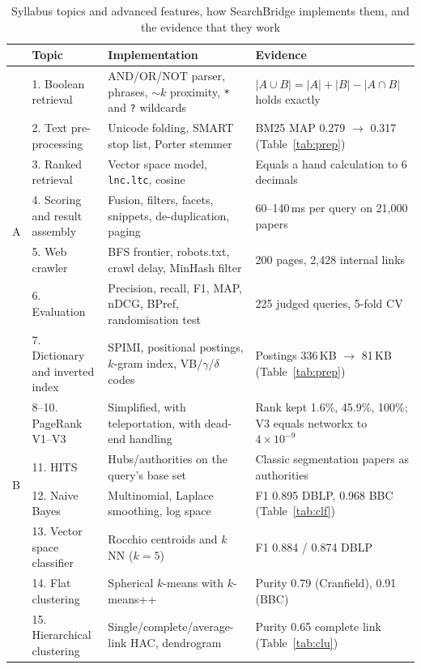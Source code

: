 \documentclass[conference]{IEEEtran}
\begin{document}
\begin{table}[t]
\caption{Syllabus topics and advanced features, how SearchBridge implements them, and the evidence that they work}
\label{tab:syllabus}
\centering\footnotesize
\begin{tabular}{@{}llp{6.0cm}p{5.3cm}@{}}
\toprule
& Topic & Implementation & Evidence \\
\midrule
\multirow{7}{*}{A} & 1. Boolean retrieval & AND/OR/NOT parser, phrases, $\sim k$ proximity, \texttt{*} and \texttt{?} wildcards & $|A\cup B|=|A|+|B|-|A\cap B|$ holds exactly \\
& 2. Text pre-processing & Unicode folding, SMART stop list, Porter stemmer & BM25 MAP 0.279 $\rightarrow$ 0.317 (Table~\ref{tab:prep}) \\
& 3. Ranked retrieval & Vector space model, \texttt{lnc.ltc}, cosine & Equals a hand calculation to 6 decimals \\
& 4. Scoring and result assembly & Fusion, filters, facets, snippets, de-duplication, paging & 60--140\,ms per query on 21,000 papers \\
& 5. Web crawler & BFS frontier, robots.txt, crawl delay, MinHash filter & 200 pages, 2,428 internal links \\
& 6. Evaluation & Precision, recall, F1, MAP, nDCG, BPref, randomisation test & 225 judged queries, 5-fold CV \\
& 7. Dictionary and inverted index & SPIMI, positional postings, $k$-gram index, VB/$\gamma$/$\delta$ codes & Postings 336\,KB $\rightarrow$ 81\,KB (Table~\ref{tab:prep}) \\
\midrule
\multirow{4}{*}{B} & 8--10. PageRank V1--V3 & Simplified, with teleportation, with dead-end handling & Rank kept 1.6\%, 45.9\%, 100\%; V3 equals networkx to $4\times10^{-9}$ \\
& 11. HITS & Hubs/authorities on the query's base set & Classic segmentation papers as authorities \\
\midrule
\multirow{4}{*}{C} & 12. Naive Bayes & Multinomial, Laplace smoothing, log space & F1 0.895 DBLP, 0.968 BBC (Table~\ref{tab:clf}) \\
& 13. Vector space classifier & Rocchio centroids and $k$NN ($k=5$) & F1 0.884 / 0.874 DBLP \\
& 14. Flat clustering & Spherical $k$-means with $k$-means++ & Purity 0.79 (Cranfield), 0.91 (BBC) \\
& 15. Hierarchical clustering & Single/complete/average-link HAC, dendrogram & Purity 0.65 complete link (Table~\ref{tab:clu}) \\

\end{tabular}
\end{table}
\end{document}
